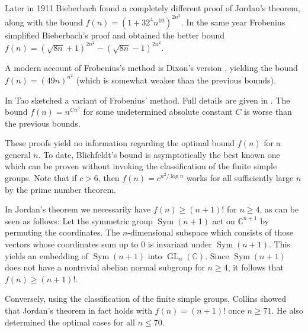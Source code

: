 \documentclass[12pt]{amsart}
\theoremstyle{plain}
\theoremstyle{definition}
\numberwithin{equation}{section}
\newcommand*{\CC}{\mathbb C}
\DeclareMathOperator{\Sym}{Sym}
\DeclareMathOperator{\GL}{GL}
\begin{document}
Later in 1911 Bieberbach \cite{Bieberbach:Jordan} found a completely
different proof of Jordan's theorem, along with the bound
$f(n)=(1+32^4n^{10})^{2n^2}$. In the same year Frobenius
\cite{Frobenius:Jordan} simplified Bieberbach's proof and obtained the
better bound $f(n)=(\sqrt{8n}+1)^{2n^2}-(\sqrt{8n}-1)^{2n^2}$.

A modern account of Frobenius's method is Dixon's version \cite[Theorem
5.7]{Dixon:LinearGroups}, yielding the bound $f(n)=(49n)^{n^2}$ (which
is somewhat weaker than the previous bounds).

In \cite{Tao:Gromov} Tao sketched a variant of Frobenius' method. Full
details are given in \cite[Section 2]{BreuillardGreen:III}. The bound
$f(n)=n^{Cn^3}$ for some undetermined absolute constant $C$ is worse
than the previous bounds.

These proofs yield no information regarding the optimal bound
$f(n)$ for a general $n$. To date, Blichfeldt's bound is
asymptotically the best known one which can be proven without invoking
the classification of the finite simple groups. Note that if $c>6$,
then $f(n)=c^{n^2/\log n}$ works for all sufficiently large $n$ by the
prime number theorem.

In Jordan's theorem we necessarily have $f(n)\ge (n+1)!$ for $n\ge4$,
as can be seen as follows: Let the symmetric group $\Sym(n+1)$ act on
$\CC^{n+1}$ by permuting the coordinates. The $n$-dimensional subspace
which consists of those vectors whose coordinates sum up to $0$ is
invariant under $\Sym(n+1)$. This yields an embedding of $\Sym(n+1)$
into $\GL_n(\CC)$. Since $\Sym(n+1)$ does not have a nontrivial
abelian normal subgroup for $n\ge4$, it follows that $f(n)\ge (n+1)!$.

Conversely, using the classification of the finite simple groups,
Collins \cite{Collins:Jordan0} showed that Jordan's theorem in fact
holds with $f(n)=(n+1)!$ once $n\ge71$. He also determined the optimal
cases for all $n\le70$.
\end{document}
